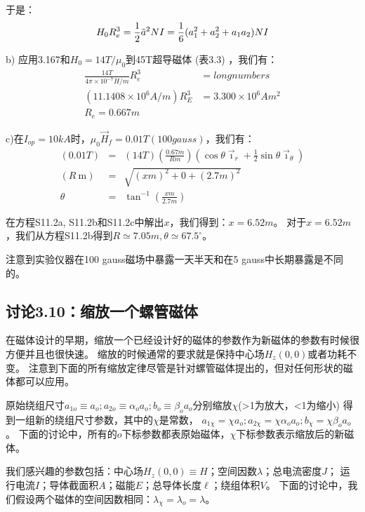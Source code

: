 于是：
\begin{equation}
H_{0}R_{e}^{3}=\frac{1}{2}\tilde{a}^{2}NI=\frac{1}{6}(a_{1}^{2}+a_{2}^{2}+a_{1}a_{2})NI\\%
\end{equation}

b) 应用3.167和$H_0=14 T/\mu_0$到45T超导磁体 (表3.3) ，我们有：
\begin{eqnarray}
\frac{14 T}{4\pi\times 10^{-7}H/m} R_e^3&= long numbers\\
(11.1408\times 10^6 A/m)R_E^3&=3.300\times 10^6 Am^2\\
R_e=0.667 m
\end{eqnarray}

c)在$I_{op}=10 kA$时，$\mu_0 \vec{H}_f=0.01 T (100 gauss)$，我们有：
\begin{eqnarray}
(0.01T)&=&(14T)(\frac{0.67m}{Rm})(\cos\theta\vec{\imath}_{r}+\frac{1}{2}\sin\theta\vec{\imath}_{\theta})\\
(R\ \mathrm{m})&=&\sqrt{(xm)^{2}+0+(2.7m)^{2}}\\%
\theta&=&\tan^{-1}(\frac{xm}{2.7m})%
\end{eqnarray}

在方程S11.2a, S11.2b和S11.2c中解出$x$，我们得到：$x=6.52 m$。
对于$x=6.52 m$，我们从方程S11.2b得到$R\simeq 7.05 m, \theta\simeq 67.5^\circ$。

注意到实验仪器在100 gauss磁场中暴露一天半天和在5 gauss中长期暴露是不同的。
\newpage


\subsection{讨论3.10：缩放一个螺管磁体}
在磁体设计的早期，缩放一个已经设计好的磁体的参数作为新磁体的参数有时候很方便并且也很快速。
缩放的时候通常的要求就是保持中心场$H_z(0,0)$或者功耗不变。
注意到下面的所有缩放定律尽管是针对螺管磁体提出的，但对任何形状的磁体都可以应用。

原始绕组尺寸$a_{1o}\equiv a_o;a_{2o}\equiv\alpha_o a_o;b_o\equiv \beta_o a_o$分别缩放$\chi$(>1为放大，<1为缩小)
得到一组新的绕组尺寸参数，其中的$\chi$是常数，
$a_{1\chi}=\chi a_o;a_{2\chi}=\chi\alpha_o a_o; b_\chi=\chi \beta_o a_o$。
下面的讨论中，所有的$o$下标参数都表原始磁体，$\chi$下标参数表示缩放后的新磁体。

我们感兴趣的参数包括：中心场$H_z(0, 0)\equiv H$；空间因数$\lambda$；总电流密度$J$；
运行电流$I$；导体截面积$A$；磁能$E$；总导体长度$\ell$；绕组体积$V$。
下面的讨论中，我们假设两个磁体的空间因数相同：$\lambda_\chi=\lambda_o=\lambda$。 

